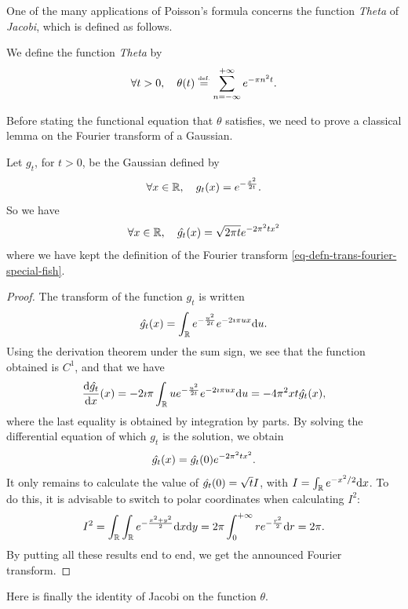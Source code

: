  
 
 One of the many applications of Poisson's formula concerns the function \textit{Theta} of \textit{Jacobi}, which is defined as follows.
 
\begin{defn}
We define the function \textit{Theta} by
\begin{equation*}
\forall t> 0, \quad \theta (t) \stackrel{\mbox{\upshape\tiny def.}}{=} \sum_{n = -\infty}^{+\infty}{e^{- \pi n^2 t}}.
\end{equation*}
\end{defn}
Before stating the functional equation that $ \theta $ satisfies, we need to prove a classical lemma on the Fourier transform of a Gaussian.
 
\begin{lem}
\label{lem-tf-gaussienne}
 Let $ g_t $, for $ t> 0 $, be the Gaussian defined by
\begin{equation*}
\forall x \in \mathbb{R}, \quad g_t (x) = e^{- \frac{x^2}{2t}}.
\end{equation*}
So we have
\begin{equation*}
\forall x \in \mathbb{R}, \quad \hat{g_t} (x) = \sqrt{2 \pi t} e^{- 2 \pi^2t x^2}
\end{equation*}
where we have kept the definition of the Fourier transform \eqref{eq-defn-trans-fourier-special-fish}.
\end{lem}
\begin{proof}
The transform of the function $ g_t $ is written
\begin{equation*}
\hat{g_t} (x) = \int_{\mathbb{R}}{e^{- \frac{u^2}{2t}} e^{- 2 \imath \pi ux} \mathrm{d} u}.
\end{equation*}
Using the derivation theorem under the sum sign, we see that the function obtained is $ C^1 $, and that we have
\begin{equation*}
\frac{\mathrm{d} \hat{g_t}}{\mathrm{d} x} (x) = -2 \imath \pi \int_{\mathbb{R}}{ue^{- \frac{u^2}{2t}} e^{-2 \imath \pi ux} \mathrm{d} u} = -4 \pi^2 xt \hat{g_t} (x),
\end{equation*}
where the last equality is obtained by integration by parts. By solving the differential equation of which $ g_t $ is the solution, we obtain
\begin{equation*}
\hat{g_t} (x) = \hat{g_t} (0) e^{- 2 \pi^2 tx^2}.
\end{equation*}
It only remains to calculate the value of $ \hat{g_t} (0) = \sqrt{t} I $, with $ I = \int_{\mathbb{R}}{e^{- x^2/2} \mathrm{d} x} $. To do this, it is advisable to switch to polar coordinates when calculating $ I^2 $:
\begin{equation*}
I^2 = \int_{\mathbb{R}}{\int_{\mathbb{R}}{e^{- \frac{x^2 + y^2}{2}} \mathrm{d} x} \mathrm{d} y} = 2 \pi \int_0^{+\infty}{re^{- \frac{r^2}{2}} \mathrm{d} r} = 2 \pi.
\end{equation*}
By putting all these results end to end, we get the announced Fourier transform.
\end{proof}
Here is finally the identity of Jacobi on the function $ \theta $.
 
